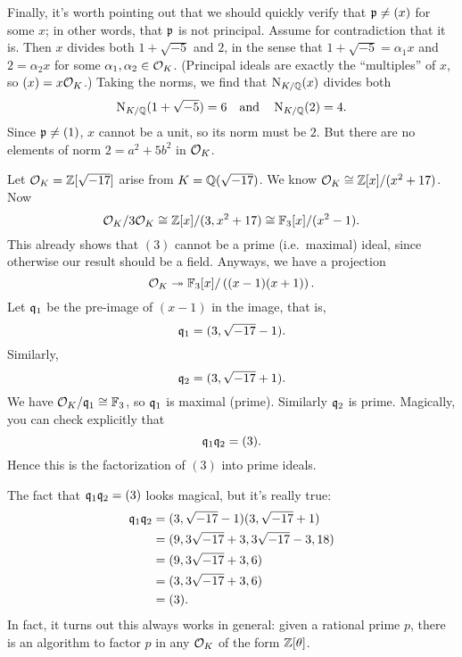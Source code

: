 Finally, it's worth pointing out that we should quickly
verify that $\mathfrak p \neq (x)$ for some $x$;
in other words, that $\mathfrak p$ is not principal.
Assume for contradiction that it is.
Then $x$ divides both $1+\sqrt{-5}$ and $2$, in the sense
that $1+\sqrt{-5} = \alpha_1 x$ and $2 = \alpha_2 x$
for some $\alpha_1, \alpha_2 \in \mathcal O_K$.
(Principal ideals are exactly the ``multiples'' of $x$, so $(x) = x \mathcal O_K$.)
Taking the norms, we find that $\operatorname{N}_{K/\mathbb Q}(x)$ divides both 
\[ \operatorname{N}_{K/\mathbb Q}(1+\sqrt{-5}) = 6 \quad\text{and}\quad \operatorname{N}_{K/\mathbb Q}(2) = 4. \]
Since $\mathfrak p \neq (1)$, $x$ cannot be a unit, so its norm must be $2$.
But there are no elements of norm $2 = a^2+5b^2$ in $\mathcal O_K$.

\begin{example}
	Let $\mathcal O_K = \mathbb Z[\sqrt{-17}]$ arise from $K = \mathbb Q(\sqrt{-17})$.
	We know $\mathcal O_K \cong \mathbb Z[x] / (x^2+17)$.
	Now
	\[
		\mathcal O_K / 3\mathcal O_K \cong \mathbb Z[x] / (3,x^2+17)
		\cong \mathbb F_3[x] / (x^2-1).
	\]
	This already shows that $(3)$ cannot be a prime (i.e.\ maximal) ideal,
	since otherwise our result should be a field.
	Anyways, we have a projection
	\[ \mathcal O_K \twoheadrightarrow \mathbb F_3[x] / \left( (x-1)(x+1) \right). \]
	Let $\mathfrak q_1$ be the pre-image of $(x-1)$ in the image, that is,
	\[ \mathfrak q_1 = (3, \sqrt{-17}-1). \]
	Similarly, \[ \mathfrak q_2 = (3, \sqrt{-17}+1). \]
	We have $\mathcal O_K / \mathfrak q_1 \cong \mathbb F_3$, so $\mathfrak q_1$ is maximal (prime).
	Similarly $\mathfrak q_2$ is prime.
	Magically, you can check explicitly that
	\[ \mathfrak q_1 \mathfrak q_2 = (3). \]
	Hence this is the factorization of $(3)$ into prime ideals.
\end{example}

The fact that $\mathfrak q_1 \mathfrak q_2 = (3)$ looks magical, but it's really true:
\begin{align*}
	\mathfrak q_1\mathfrak q_2
	&= (3, \sqrt{-17}-1) (3, \sqrt{-17}+1) \\
	&= (9, 3\sqrt{-17}+3, 3\sqrt{-17}-3, 18) \\
	&= (9, 3\sqrt{-17}+3, 6) \\
	&= (3, 3\sqrt{-17}+3, 6) \\
	&= (3).
\end{align*}
In fact, it turns out this always works in general:
given a rational prime $p$, there is an algorithm
to factor $p$ in any $\mathcal O_K$ of the form $\mathbb Z[\theta]$.

